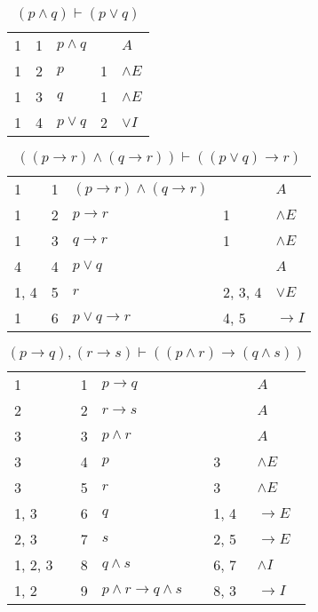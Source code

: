 \documentclass{article}
\begin{document}
\begin{table}[htbp]\caption*{$(p∧q) ⊢ (p∨q)$}\centering\begin{tabular}{lrlll}
		{1} & 1 & $p∧q$ & {} & $A$ \\
		{1} & 2 & $p$ & {1} & $∧E$ \\
		{1} & 3 & $q$ & {1} & $∧E$ \\
		{1} & 4 & $p∨q$ & {2} & $∨I$ \\
	\end{tabular}
\end{table}
\begin{table}[htbp]\caption*{$((p→r)∧(q→r)) ⊢ ((p∨q)→r)$}\centering\begin{tabular}{lrlll}
		{1} & 1 & $(p→r)∧(q→r)$ & {} & $A$ \\
		{1} & 2 & $p→r$ & {1} & $∧E$ \\
		{1} & 3 & $q→r$ & {1} & $∧E$ \\
		{4} & 4 & $p∨q$ & {} & $A$ \\
		{1, 4} & 5 & $r$ & {2, 3, 4} & $∨E$ \\
		{1} & 6 & $p∨q→r$ & {4, 5} & $→I$ \\
	\end{tabular}
\end{table}
\begin{table}[htbp]\caption*{$(p→q),(r→s) ⊢ ((p∧r)→(q∧s))$}\centering\begin{tabular}{lrlll}
		{1} & 1 & $p→q$ & {} & $A$ \\
		{2} & 2 & $r→s$ & {} & $A$ \\
		{3} & 3 & $p∧r$ & {} & $A$ \\
		{3} & 4 & $p$ & {3} & $∧E$ \\
		{3} & 5 & $r$ & {3} & $∧E$ \\
		{1, 3} & 6 & $q$ & {1, 4} & $→E$ \\
		{2, 3} & 7 & $s$ & {2, 5} & $→E$ \\
		{1, 2, 3} & 8 & $q∧s$ & {6, 7} & $∧I$ \\
		{1, 2} & 9 & $p∧r→q∧s$ & {8, 3} & $→I$ \\
	\end{tabular}
\end{table}
\end{document}
